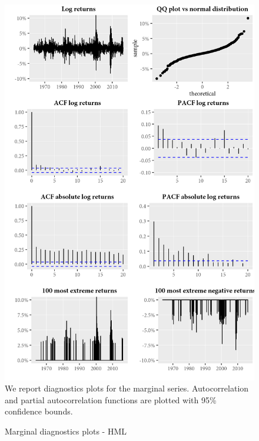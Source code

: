 \begin{figure}[H]
  \caption{Marginal diagnostics plots - HML}
  \label{diag:marginaldiagHML}
  \centering
  \begin{minipage}{\textwidth}
  \includegraphics[scale=1]{graphics/marginal/MarginalStats.HML.Estim.png}  
  \vspace{3mm}
  \footnotesize
  We report diagnostics plots for the marginal series. Autocorrelation and partial autocorrelation functions are plotted with 95\% confidence bounds. 
  \end{minipage}
\end{figure}

